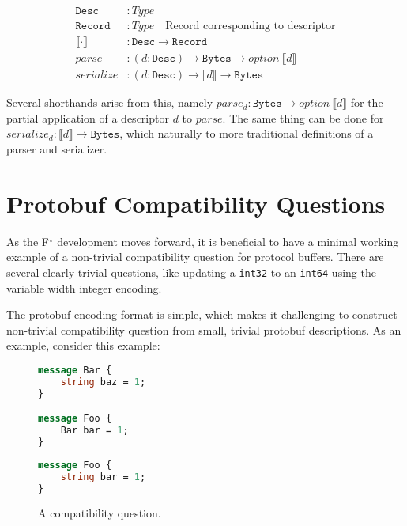 \documentclass[11pt]{article}
\theoremstyle{definition}
\theoremstyle{plain}
\newcommand{\fstar}{F$^\star$}
\begin{document}
\begin{align*}
	\mathtt{Desc}               & : Type                                                                             \\
	\mathtt{Record}             & : Type \quad \text{Record corresponding to descriptor}                             \\
	\llbracket \cdot \rrbracket & : \mathtt{Desc} \rightarrow \mathtt{Record}                                        \\
	parse                       & : (d:\mathtt{Desc}) \rightarrow \mathtt{Bytes} \rightarrow option\
	\llbracket d \rrbracket                                                                                          \\
	serialize                   & : (d:\mathtt{Desc}) \rightarrow \llbracket d \rrbracket \rightarrow \mathtt{Bytes}
\end{align*}

Several shorthands arise from this, namely $parse_d : \mathtt{Bytes} \rightarrow option\
	\llbracket d \rrbracket$ for the partial application of a descriptor $d$ to
$parse$. The same thing can be done for $serialize_d : \llbracket d \rrbracket \rightarrow
	\mathtt{Bytes}$, which naturally to more traditional definitions of a parser and serializer.

\section{Protobuf Compatibility Questions}

As the \fstar{} development moves forward, it is beneficial to have a minimal
working example of a non-trivial compatibility question for protocol
buffers. There are several clearly trivial questions, like updating a
\texttt{int32} to an \texttt{int64} using the variable width integer encoding.

The protobuf encoding format is simple, which makes it challenging to construct
non-trivial compatibility question from small, trivial protobuf descriptions. As
an example, consider this example:

\begin{figure}[H]
	\centering
	\begin{minipage}[bt]{0.4\textwidth}
		\begin{lstlisting}[language=proto]
message Bar {
    string baz = 1;
}

message Foo {
    Bar bar = 1;
}\end{lstlisting}
	\end{minipage}
	\hspace{1cm}
	\begin{minipage}[bt]{0.4\textwidth}
		\begin{lstlisting}[language=proto]
message Foo {
    string bar = 1;
}\end{lstlisting}
	\end{minipage}

	\caption[]{A compatibility question.}
\end{figure}
\end{document}
